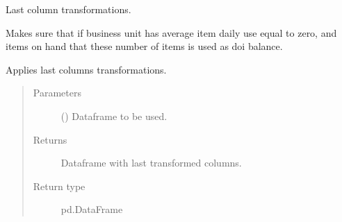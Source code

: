 \documentclass[letterpaper,10pt,english]{sphinxmanual}
\begin{document}

\begin{fulllineitems}
\label{\detokenize{source/optimization.datatools:optimization.datatools.dataprep.last_transformations}}
Last column transformations.

Makes sure that if business unit has average
item daily use equal to zero, and items on
hand that these number of items is used as
doi balance.

Applies last columns transformations.
\begin{quote}\begin{description}
\item[{Parameters}] \leavevmode
{} () \textendash{} Dataframe to be used.

\item[{Returns}] \leavevmode
{} \textendash{} Dataframe with last transformed columns.

\item[{Return type}] \leavevmode
pd.DataFrame

\end{description}\end{quote}

\end{fulllineitems}

\end{document}
